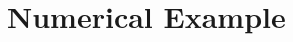 \documentclass[letterpaper, 10pt, conference]{ieeeconf}
\begin{document}
\section{Numerical Example}%
\label{NumRes}
%
%
%	
%
%
%	
%
\end{document}
